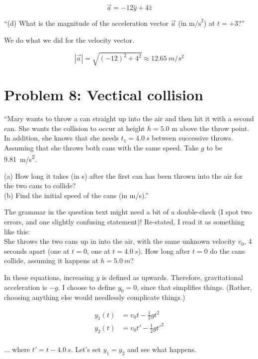 \documentclass[12pt,a4paper]{report}
\begin{document}
\begin{equation}
\vec{a} = -12 \hat{y} + 4\hat{z}
\end{equation}

``(d) What is the magnitude of the acceleration vector $\vec{a}$ (in $\text{m/s}^2$) at $t = +3$?''

We do what we did for the velocity vector.

\begin{equation}
|\vec{a}| = \sqrt{(-12)^2 + 4^2} \approx \SI{12.65}{m/s^2}
\end{equation}

\section{Problem 8: Vectical collision}

``Mary wants to throw a can straight up into the air and then hit it with a second can. She wants the collision to occur at height $h = 5.0$ m above the throw point. In addition, she knows that she needs $t_1 = \SI{4.0}{s}$ between successive throws. Assuming that she throws both cans with the same speed. Take $g$ to be \SI{9.81}{m/s^2}.

(a) How long it takes (in s) after the first can has been thrown into the air for the two cans to collide?\\
(b) Find the initial speed of the cans (in m/s).''

The grammar in the question text might need a bit of a double-check (I spot two errors, and one slightly confusing statement)! Re-stated, I read it as something like this:\\
She throws the two cans up in into the air, with the same unknown velocity $v_0$, 4 seconds apart (one at $t = 0$, one at $t = \SI{4.0}{s}$). How long after $t = 0$ do the cans collide, assuming it happens at $h = \SI{5.0}{m}$?

In these equations, increasing $y$ is defined as upwards. Therefore, gravitational acceleration is $-g$. I choose to define $y_0 = 0$, since that simplifies things. (Rather, choosing anything else would needlessly complicate things.)

\begin{align}
 y_1(t) &= v_0 t - \frac{1}{2} g t^2\\
 y_2(t) &= v_0 t' - \frac{1}{2} g t'^2\\
\end{align}

... where $t' = t - \SI{4.0}{s}$.
Let's set $y_1 = y_2$ and see what happens.
\end{document}
